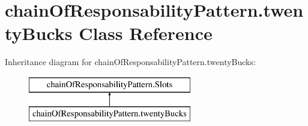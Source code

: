 \hypertarget{classchain_of_responsability_pattern_1_1twenty_bucks}{}\section{chain\+Of\+Responsability\+Pattern.\+twenty\+Bucks Class Reference}
\label{classchain_of_responsability_pattern_1_1twenty_bucks}
Inheritance diagram for chain\+Of\+Responsability\+Pattern.\+twenty\+Bucks\+:\begin{figure}[H]
\begin{center}
\leavevmode
\includegraphics[height=2.000000cm]{classchain_of_responsability_pattern_1_1twenty_bucks}
\end{center}
\end{figure}
